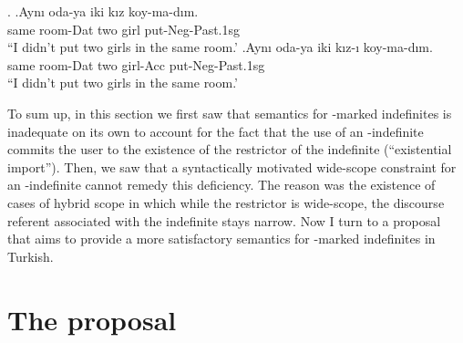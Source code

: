 \documentclass[11pt,a4paper]{article}
\begin{document}
\ex.
\ag.\label{odaz}Aynı oda-ya iki kız koy-ma-dım.\\
same room-Dat  two girl put-Neg-Past.1sg\\
``I didn't put two girls in the same room.'
\bg.\label{odaa}Aynı oda-ya iki kız-ı koy-ma-dım.\\
same room-Dat  two girl-Acc put-Neg-Past.1sg\\
``I didn't put two girls in the same room.'

To sum up, in this section we first saw that  semantics
for \acc-marked indefinites is inadequate on its own to account for
the fact that the use of an \acc-indefinite commits the user to the
existence of the restrictor of the indefinite (``existential
import''). Then, we saw that a syntactically motivated wide-scope
constraint for an \acc-indefinite cannot remedy this deficiency. The
reason was the existence of cases of hybrid scope in which while the
restrictor is wide-scope, the discourse referent associated with the
indefinite stays narrow. Now I turn to a proposal that aims to provide
a more satisfactory semantics for \acc-marked indefinites in Turkish.





%
%
% 
% 



\section{The proposal}
\label{scproposal}

\end{document}

